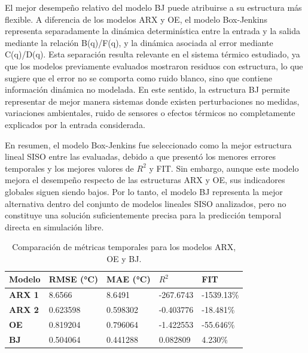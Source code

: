 \documentclass[11pt]{report}
\begin{document}
El mejor desempeño relativo del modelo BJ puede atribuirse a su estructura más flexible. A diferencia de los modelos ARX y OE, el modelo Box-Jenkins representa separadamente la dinámica determinística entre la entrada y la salida mediante la relación B(q)/F(q), y la dinámica asociada al error mediante C(q)/D(q). Esta separación resulta relevante en el sistema térmico estudiado, ya que los modelos previamente evaluados mostraron residuos con estructura, lo que sugiere que el error no se comporta como ruido blanco, sino que contiene información dinámica no modelada. En este sentido, la estructura BJ permite representar de mejor manera sistemas donde existen perturbaciones no medidas, variaciones ambientales, ruido de sensores o efectos térmicos no completamente explicados por la entrada considerada.

En resumen, el modelo Box-Jenkins fue seleccionado como la mejor estructura lineal SISO entre las evaluadas, debido a que presentó los menores errores temporales y los mejores valores de $R^2$ y FIT. Sin embargo, aunque este modelo mejora el desempeño respecto de las estructuras ARX y OE, sus indicadores globales siguen siendo bajos. Por lo tanto, el modelo BJ representa la mejor alternativa dentro del conjunto de modelos lineales SISO analizados, pero no constituye una solución suficientemente precisa para la predicción temporal directa en simulación libre.




\begin{table}[H]
\centering
\begin{tabular}{|l|l|l|l|l|}
\hline
\textbf{Modelo} & \textbf{RMSE (°C)} & \textbf{MAE (°C)} & \textbf{$R^2$} & \textbf{FIT} \\ \hline
\textbf{ARX 1}  & 8.6566           & 8.6491          & -267.6743                     & -1539.13\%  \\ \hline
\textbf{ARX 2}  & 0.623598           & 0.598302          & -0.403776                     & -18.481\%  \\ \hline
\textbf{OE}     & 0.819204           & 0.796064          & -1.422553                     & -55.646\%  \\ \hline
\textbf{BJ}     & 0.504064           & 0.441288          & 0.082809                      & 4.230\%    \\ \hline
\end{tabular}
\caption{Comparación de métricas temporales para los modelos ARX, OE y BJ.} 
\label{tab:metricas_modelos}
\end{table}
\end{document}
